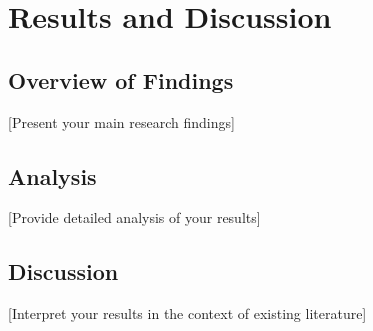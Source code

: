 \chapter{Results and Discussion}

\section{Overview of Findings}
[Present your main research findings]

\section{Analysis}
[Provide detailed analysis of your results]

\section{Discussion}
[Interpret your results in the context of existing literature]

